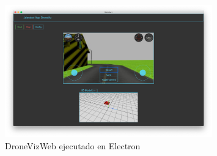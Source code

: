 \begin{figure}[H]
  \begin{center}
    \includegraphics[width=0.8\textwidth]{figures/dronevizelectron.png}
    		\caption{DroneVizWeb ejecutado en Electron}
		\label{fig.dronevizelectron}
		\end{center}
\end{figure}










